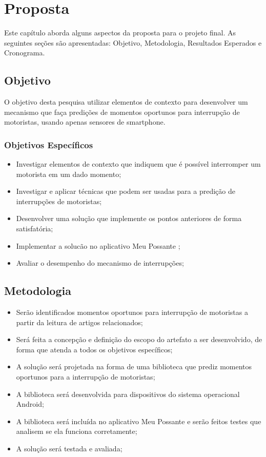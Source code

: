\chapter{Proposta}
\label{proposta}
Este capítulo aborda alguns aspectos da proposta para o projeto final. As seguintes seções são apresentadas:
Objetivo, Metodologia, Resultados Esperados e Cronograma.

\section{Objetivo}
\label{objetivo}
O objetivo desta pesquisa utilizar elementos de contexto para desenvolver um mecanismo que faça predições de
momentos oportunos para interrupção de motoristas, usando apenas sensores de smartphone.

\subsection{Objetivos Específicos}
\label{objetivos-esp}
\begin{itemize}
  \item Investigar elementos de contexto que indiquem que é possível interromper um motorista em um dado momento;
  \item Investigar e aplicar técnicas que podem ser usadas para a predição de interrupções de motoristas;
  \item Desenvolver uma solução que implemente os pontos anteriores de forma satisfatória;
  \item Implementar a solucão no aplicativo Meu Possante \cite{meupossante};
  \item Avaliar o desempenho do mecanismo de interrupções;
\end{itemize}

\section{Metodologia}
\label{metodologia}
\begin{itemize}
  \item Serão identificados momentos oportunos para interrupção de motoristas a partir da leitura de artigos
    relacionados;
  \item Será feita a concepção e definição do escopo do artefato a ser desenvolvido, de forma que atenda a
    todos os objetivos específicos;
  \item A solução será projetada na forma de uma biblioteca que prediz momentos oportunos para a interrupção
    de motoristas;
  \item A biblioteca será desenvolvida para dispositivos do sistema operacional Android;
  \item A biblioteca será incluída no aplicativo Meu Possante \cite{meupossante} e serão feitos testes que analisem se ela funciona
    corretamente;
  \item A solução será testada e avaliada;
\end{itemize}

